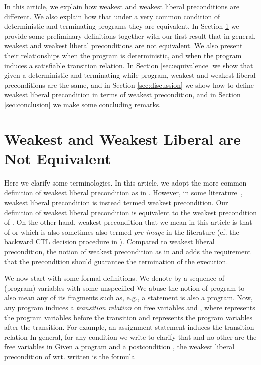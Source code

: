\documentclass[times]{elsarticle}
\begin{document}
In this article, we explain how weakest and weakest liberal
preconditions are different. We also explain how that under a very
common condition of deterministic and terminating programs they are
equivalent. In Section \ref{sec:nonequivalence} we provide some
preliminary definitions together with our first result that in
general, weakest and weakest liberal preconditions are not equivalent.
We also present their relationships when the program is deterministic,
and when the program induces a satisfiable transition relation. In
Section \ref{sec:equivalence} we show that given a deterministic and
terminating while program, weakest and weakest liberal preconditions
are the same, and in Section \ref{sec:discussion} we show how to
define weakest liberal precondition in terms of weakest precondition,
and in Section \ref{sec:conclusion} we make some concluding remarks.

\section{Weakest and Weakest Liberal are Not Equivalent}
\label{sec:nonequivalence}

Here we clarify some terminologies. In this article, we adopt the more
common definition of weakest liberal precondition as in
\cite{dijkstra76lang}. However, in some
literature~\cite{bjornerinv97}, weakest liberal precondition is
instead termed weakest precondition. Our definition of weakest liberal
precondition is equivalent to the weakest precondition of
\cite{bjornerinv97}. On the other hand, weakest precondition that we
mean in this article is that of \cite{dijkstra75gcl} or
\cite{dijkstra76lang} which is also sometimes also termed
\emph{pre-image\/} in the literature (cf. the backward CTL decision
procedure in \cite{Huth:ModelChecking00}). Compared to weakest liberal
precondition, the notion of weakest precondition as in
\cite{dijkstra76lang} and \cite{dijkstra75gcl} adds the requirement
that the precondition should guarantee the termination of the
execution.

We now start with some formal definitions. We denote by  a
sequence  of (program) variables with some
unspecified  We abuse the notion of program to also mean any of
its fragments such as, e.g., a statement is also a program. Now, any
program  induces a \emph{transition relation\/}  on free variables  and , where
 represents the program variables before the transition and
 represents the program variables after the transition.
For example, an assignment statement  induces the transition relation  In general, for any condition  we write
 to clarify that  and no other are the
free variables in  Given a program  and a postcondition
, the weakest liberal precondition of
 wrt.  written
 is the formula
\end{document}
